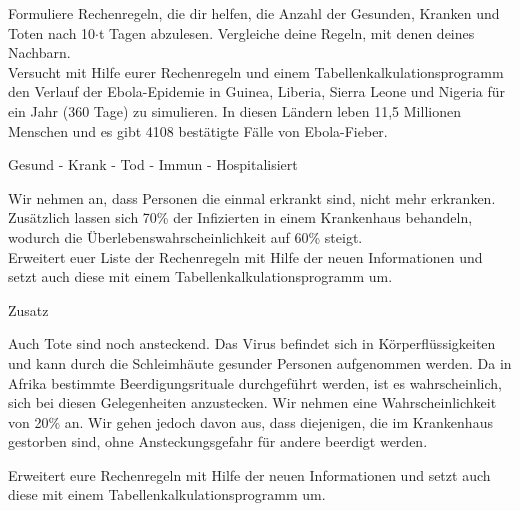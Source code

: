 \documentclass[11pt]{beamer}
\begin{document}
\begin{frame}
Formuliere Rechenregeln, die dir helfen, die Anzahl der Gesunden, Kranken und Toten nach 10$\cdot$t Tagen abzulesen. Vergleiche deine Regeln, mit denen deines Nachbarn.\\

Versucht mit Hilfe eurer Rechenregeln und einem Tabellenkalkulationsprogramm den Verlauf der Ebola-Epidemie in Guinea, Liberia, Sierra Leone und Nigeria für ein Jahr (360 Tage) zu simulieren. In diesen Ländern leben 11,5 Millionen Menschen und es gibt 4108 bestätigte Fälle von Ebola-Fieber.\\ 
\end{frame}
\begin{frame}{Gesund - Krank - Tod - Immun - Hospitalisiert}

Wir nehmen an, dass Personen die einmal erkrankt sind, nicht mehr erkranken. Zusätzlich lassen sich 70\% der Infizierten in einem Krankenhaus behandeln, wodurch die Überlebenswahrscheinlichkeit auf 60\% steigt.\\

Erweitert euer Liste der Rechenregeln mit Hilfe der neuen Informationen und setzt auch diese mit einem Tabellenkalkulationsprogramm um.

\end{frame}
\begin{frame} {Zusatz}

Auch Tote sind noch ansteckend. Das Virus befindet sich in Körperflüssigkeiten und kann durch die Schleimhäute gesunder Personen aufgenommen werden. Da in Afrika bestimmte Beerdigungsrituale durchgeführt werden, ist es wahrscheinlich, sich bei diesen Gelegenheiten anzustecken. Wir nehmen eine Wahrscheinlichkeit von 20\% an. Wir gehen jedoch davon aus, dass diejenigen, die im Krankenhaus gestorben sind, ohne Ansteckungsgefahr für andere beerdigt werden.

\end{frame}

\begin{frame}
Erweitert eure Rechenregeln mit Hilfe der neuen Informationen und setzt auch diese mit einem Tabellenkalkulationsprogramm um. 
\end{frame}
\end{document}
